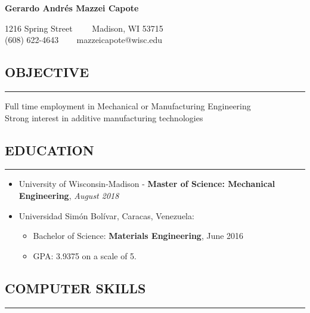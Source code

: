 \documentclass[11pt,letterpaper]{article}
\newenvironment{indentsection}[1]%
{\begin{list}{}%
	{\setlength{\leftmargin}{#1}}%
	\item[]%
}
{\end{list}}
\begin{document}
	\thispagestyle{firststyle}
	
\begin{center}
	{\LARGE \textbf{Gerardo Andrés Mazzei Capote}}

	1216 Spring Street\ \ \textbullet
	\ \ Madison, WI 53715
	\\
	(608) 622-4643 \ \textbullet
	\ \ mazzeicapote@wisc.edu
\end{center}

\vspace{-1em}

\subsection*{OBJECTIVE}
	\vspace{-0.5em}
	\hrule
	\vspace{0.4em}
	\begin{indentsection}{\parindent}
		Full time employment in Mechanical or Manufacturing Engineering\\
		Strong interest in additive manufacturing technologies
	\end{indentsection}


\subsection*{EDUCATION}
	\vspace{-0.5em}
	\hrule
	\vspace{0.4em}
	\begin{itemize}
	\item
	University of Wisconsin-Madison - \textbf{Master of Science: Mechanical
	Engineering}, \emph{August 2018}
	\item
	Universidad Simón Bolívar, Caracas, Venezuela:
	\begin{itemize}	
		\item
		Bachelor of Science: \textbf{Materials Engineering}, June 2016
		\item
		GPA: 3.9375 on a scale of 5.
	\end{itemize}
	\end{itemize}

\subsection*{COMPUTER SKILLS}
	\vspace{-0.5em}
	\hrule
	\vspace{0.4em}
	
\end{document}
